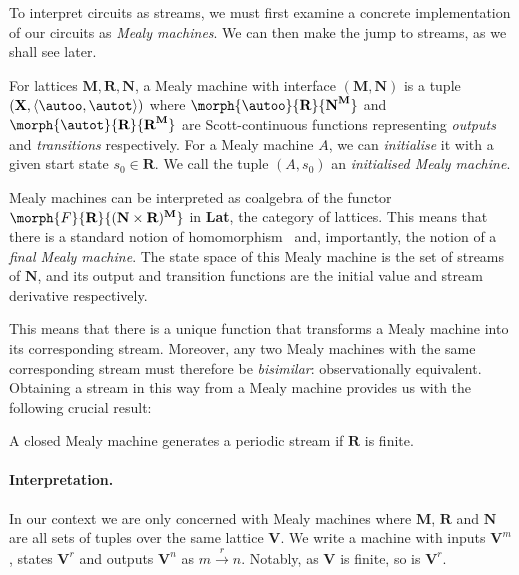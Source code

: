 \documentclass[11pt,numbib]{article}
\begin{document}
To interpret circuits as streams, we must first examine a concrete implementation of our circuits as \emph{Mealy machines}.
We can then make the jump to streams, as we shall see later.

\begin{definition}
    For lattices $\textbf{M},\textbf{R},\textbf{N}$, a Mealy machine with interface $(\textbf{M},\textbf{N})$ is a tuple $(\textbf{X},\langle \autoo, \autot \rangle)$ where $\morph{\autoo}{\textbf{R}}{\textbf{N}^\textbf{M}}$ and $\morph{\autot}{\textbf{R}}{\textbf{R}^\textbf{M}}$ are Scott-continuous functions representing \emph{outputs} and \emph{transitions} respectively.
    For a Mealy machine $A$, we can \emph{initialise} it with a given start state $s_0 \in \textbf{R}$.
    We call the tuple $(A,s_0)$ an \emph{initialised Mealy machine}.
\end{definition}

\noindent
Mealy machines can be interpreted as coalgebra of the functor $\morph{F}{\textbf{R}}{(\textbf{N} \times \textbf{R})^\textbf{M}}$ in \textbf{Lat}, the category of lattices.
This means that there is a standard notion of homomorphism~\parencite{bonsangue2008coalgebraic} and, importantly, the notion of a \emph{final Mealy machine}.
The state space of this Mealy machine is the set of streams of $\textbf{N}$, and its output and transition functions are the initial value and stream derivative respectively.

This means that there is a unique function that transforms a Mealy machine into its corresponding stream.
Moreover, any two Mealy machines with the same corresponding stream must therefore be \emph{bisimilar}: observationally equivalent. 
Obtaining a stream in this way from a Mealy machine provides us with the following crucial result:

\begin{proposition}
    A closed Mealy machine generates a periodic stream if $\textbf{R}$ is finite.
\end{proposition}

\paragraph*{Interpretation.}

In our context we are only concerned with Mealy machines where $\textbf{M}$, $\textbf{R}$ and $\textbf{N}$ are all sets of tuples over the same lattice $\textbf{V}$.
We write a machine with inputs $\textbf{V}^m$, states $\textbf{V}^r$ and outputs $\textbf{V}^n$ as $m \xrightarrow{r} n$.
Notably, as $\textbf{V}$ is finite, so is $\textbf{V}^r$.
\end{document}
